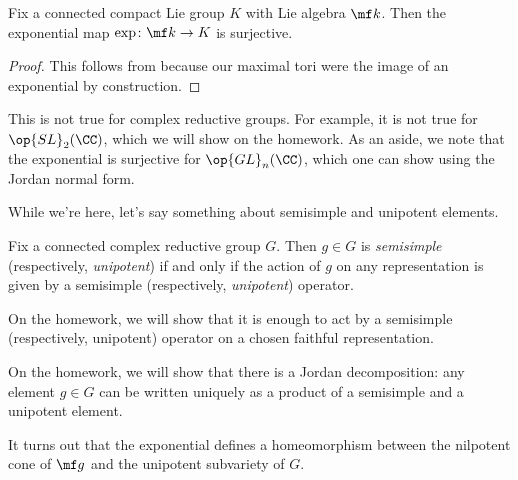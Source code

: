 \documentclass[../notes.tex]{subfiles}
\begin{document}
\begin{corollary}
	Fix a connected compact Lie group $K$ with Lie algebra $\mf k$. Then the exponential map $\exp\colon\mf k\to K$ is surjective.
\end{corollary}
\begin{proof}
	This follows from  because our maximal tori were the image of an exponential by construction.
\end{proof}
\begin{remark}
	This is not true for complex reductive groups. For example, it is not true for $\op{SL}_2(\CC)$, which we will show on the homework. As an aside, we note that the exponential is surjective for $\op{GL}_n(\CC)$, which one can show using the Jordan normal form.
\end{remark}
While we're here, let's say something about semisimple and unipotent elements.
\begin{defihelper}  
	Fix a connected complex reductive group $G$. Then $g\in G$ is \textit{semisimple} (respectively, \textit{unipotent}) if and only if the action of $g$ on any representation is given by a semisimple (respectively, \textit{unipotent}) operator.
\end{defihelper}
\begin{remark}
	On the homework, we will show that it is enough to act by a semisimple (respectively, unipotent) operator on a chosen faithful representation.
\end{remark}
\begin{remark}
	On the homework, we will show that there is a Jordan decomposition: any element $g\in G$ can be written uniquely as a product of a semisimple and a unipotent element.
\end{remark}
\begin{remark}
	It turns out that the exponential defines a homeomorphism between the nilpotent cone of $\mf g$ and the unipotent subvariety of $G$.
\end{remark}
\end{document}
